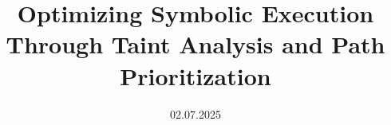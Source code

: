 \documentclass[a4paper, 10pt, oneside]{memoir}
\title				{Optimizing Symbolic Execution Through Taint Analysis and Path Prioritization}
\date				{02.07.2025}
\begin{document}

\thesisfront
\maketitle
\pagestyle{thesis}
% 

\thesistoc
\thesismain



%
%
%
%
\thesisappendix
\thesisbib
\begin{appendices}
	 
\end{appendices}
\thesisback
{}
  {}
  {}
\end{document}
